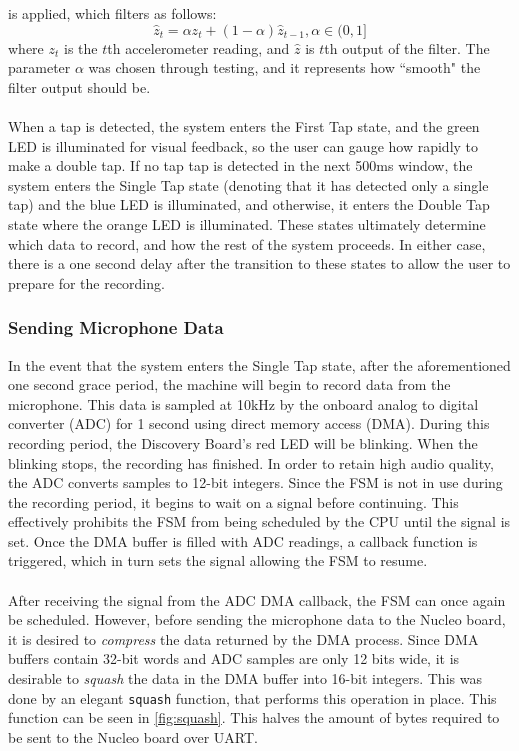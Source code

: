 is applied, which filters as follows:
\begin{equation}
	\hat{z}_{t} = \alpha z_{t} + (1-\alpha)\hat{z}_{t-1}, \alpha\in(0,1]
\end{equation}
where $z_t$ is the $t$th accelerometer reading, and $\hat{z}$ is $t$th output of the filter. The
parameter $\alpha$ was chosen through testing, and it represents how ``smooth" the filter output
should be.\\\\
When a tap is detected, the system enters the First Tap state, and the green LED is illuminated for
visual feedback, so the user can gauge how rapidly to make a double tap. If no tap tap is detected
in the next 500ms window, the system enters the Single Tap state (denoting that it has detected only
a single tap) and the blue LED is illuminated, and otherwise, it enters the Double Tap state where
the orange LED is illuminated. These states ultimately determine
which data to record, and how the rest of the system proceeds. In either case, there is a one second
delay after the transition to these states to allow the user to prepare for the recording.
\subsubsection{Sending Microphone Data}
In the event that the system enters the Single Tap state, after the aforementioned one second grace
period, the machine will begin to record data from the microphone. This data is sampled at 10kHz by
the onboard analog to digital converter (ADC) for 1 second using direct memory access (DMA). During
this recording period, the Discovery Board's red LED will be blinking. When the blinking stops, the
recording has finished. In
order to retain high audio quality, the ADC converts samples to 12-bit integers. Since
the FSM is not in use during the recording period, it begins to wait on a signal before continuing.
This effectively prohibits the FSM from being scheduled by the CPU until the signal is set. Once
the DMA buffer is filled with ADC readings, a callback function is triggered, which in turn sets the
signal allowing the FSM to resume.\\\\
After receiving the signal from the ADC DMA callback, the FSM can once again be scheduled. However,
before sending the microphone data to the Nucleo board, it is desired to \textit{compress} the data
returned by the DMA process. Since DMA buffers contain 32-bit words and ADC samples are only 12 bits
wide, it is desirable to \textit{squash} the data in the DMA buffer into 16-bit integers. This was
done by an elegant \texttt{squash} function, that performs this operation in place. This function can be seen in \autoref{fig:squash}. This halves the
amount of bytes required to be sent to the Nucleo board over UART.\\\\

